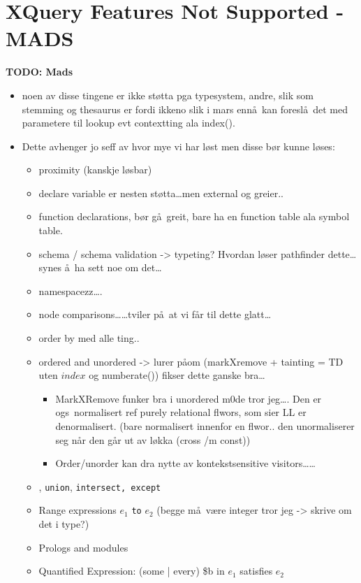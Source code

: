 \section{XQuery Features Not Supported - {MADS}}
\label{sect:disc:notSupported}
\textbf{\LARGE TODO: Mads}
\begin{itemize}
\item noen av disse tingene er ikke st\o tta pga typesystem, andre, slik som stemming og thesaurus er fordi ikkeno
slik i mars enn\aa~kan foresl\aa~det med parametere til lookup evt contextting ala \textsf{index()}.
  \item Dette avhenger jo seff av hvor mye vi har l\o st men disse b\o r kunne
  l\o ses:
  	\begin{itemize}
  		\item proximity (kanskje l\o sbar)
  		\item declare variable er nesten st\o tta\ldots men external og greier..
  		\item function declarations, b\o r g\aa~greit, bare ha en function table ala symbol table.
  		\item schema / schema validation -> typeting? Hvordan l\o ser pathfinder dette\ldots synes \aa~ha sett noe om
  		det\ldots
  		\item namespacezz\ldots.
  		\item node comparisons\ldots\ldots tviler p\aa~at vi f\aa r til dette glatt\ldots
  		\item order by med alle ting..
  		\item ordered and unordered -> lurer p\aa om (markXremove + tainting = TD uten $index$ og
  		\textsf{numberate()}) fikser dette ganske bra\ldots
  		\begin{itemize}
			\item MarkXRemove funker bra i unordered m0de tror jeg\ldots. Den er ogs\a~normalisert ref purely relational
			flwors, som sier LL er denormalisert. (bare normalisert innenfor en flwor.. den unormaliserer seg n\aa r den
			g\aa r ut av l\o kka (cross /m const))
			\item Order/unorder kan dra nytte av kontekstsensitive visitors\ldots\ldots
		\end{itemize}
  		\item \textbar, \texttt{union}, \texttt{intersect, except}
  		\item Range expressions $e_1$ \texttt{to} $e_2$ (begge m\aa~v\ae re integer tror jeg -> skrive om det i type?)
  		\item Prologs and modules
  		\item Quantified Expression: (some | every) \$b in $e_1$ satisfies $e_2$
  		\end{itemize}
	\end{itemize}

